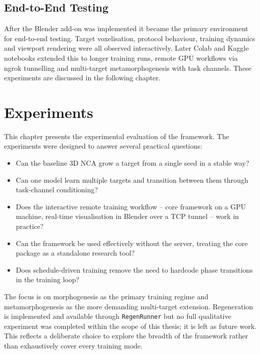\section{End-to-End Testing}

After the Blender add-on was implemented it became the primary environment for
end-to-end testing. Target voxelisation, protocol behaviour, training dynamics
and viewport rendering were all observed interactively. Later Colab and Kaggle
notebooks extended this to longer training runs, remote GPU workflows via ngrok
tunnelling and multi-target metamorphogenesis with task channels. These
experiments are discussed in the following chapter.

\chapter{Experiments}
\label{chap:experiments}

This chapter presents the experimental evaluation of the framework. The
experiments were designed to answer several practical questions:

\begin{itemize}
    \item Can the baseline 3D NCA grow a target from a single seed in a stable
          way?
    \item Can one model learn multiple targets and transition between them
          through task-channel conditioning?
    \item Does the interactive remote training workflow -- core framework on
          a GPU machine, real-time visualisation in Blender over a TCP
          tunnel -- work in practice?
    \item Can the framework be used effectively without the server, treating
          the core package as a standalone research tool?
    \item Does schedule-driven training remove the need to hardcode phase
          transitions in the training loop?
\end{itemize}

The focus is on morphogenesis as the primary training regime and
metamorphogenesis as the more demanding multi-target extension. Regeneration
is implemented and available through \texttt{RegenRunner} but no full
qualitative experiment was completed within the scope of this thesis; it is
left as future work. This reflects a deliberate choice to explore the breadth
of the framework rather than exhaustively cover every training mode.

